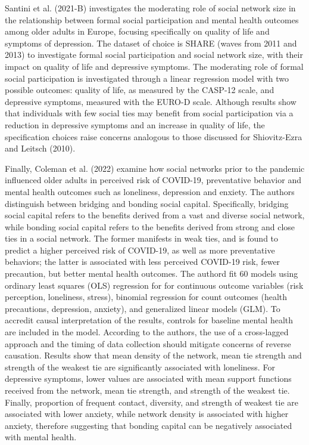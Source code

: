     Santini et al. (2021-B) investigates the moderating role of social network size in the relationship between formal social participation and mental health outcomes among older adults in Europe, focusing specifically on quality of life and symptoms of depression. The dataset of choice is SHARE (waves from 2011 and 2013) to investigate formal social participation and social network size, with their impact on quality of life and depressive symptoms. The moderating role of formal social participation is investigated through a linear regression model with two possible outcomes: quality of life, as measured by the CASP-12 scale, and depressive symptoms, measured with the EURO-D scale. Although results show that individuals with few social ties may benefit from social participation via a reduction in depressive symptoms and an increase in quality of life, the specification choices raise concerns analogous to those discussed for Shiovitz-Ezra and Leitsch (2010).

    Finally, Coleman et al. (2022) examine how social networks prior to the pandemic influenced older adults in perceived risk of COVID-19, preventative behavior and mental health outcomes such as loneliness, depression and enxiety. The authors distinguish between bridging and bonding social capital. Specifically, bridging social capital refers to the benefits derived from a vast and diverse social network, while bonding social capital refers to the benefits derived from strong and close ties in a social network. The former manifests in weak ties, and is found to predict a higher perceived risk of COVID-19, as well as more preventative behaviors; the latter is associated with less perceived COVID-19 risk, fewer precaution, but better mental health outcomes. The authord fit 60 models using ordinary least squares (OLS) regression for for continuous outcome variables (risk perception, loneliness, stress), binomial regression for count outcomes (health precautions, depression, anxiety), and generalized linear models (GLM). To accredit causal interpretation of the results, controls for baseline mental health are included in the model. According to the authors, the use of a cross-lagged approach and the timing of data collection should mitigate concerns of reverse causation.
    Results show that mean density of the network, mean tie strength and strength of the weakest tie are significantly associated with loneliness. For depressive symptoms, lower values are associated with mean support functions received from the network, mean tie strength, and strength of the weakest tie. Finally, proportion of frequent contact, diversity, and strength of weakest tie are associated with lower anxiety, while network density is associated with higher anxiety, therefore suggesting that bonding capital can be negatively associated with mental health. 



